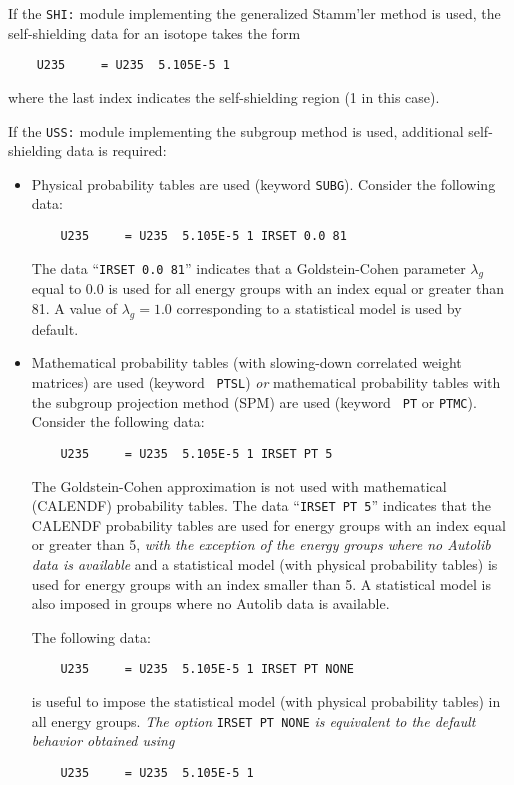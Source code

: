 \vskip 0.15cm

If the {\tt SHI:} module implementing the generalized Stamm'ler method is used,
the self-shielding data for an isotope takes the form
\begin{verbatim}
    U235     = U235  5.105E-5 1
\end{verbatim}
\noindent where the last index indicates the self-shielding region (1 in this case). 

\vskip 0.15cm

If the {\tt USS:} module implementing the subgroup method is used,
additional self-shielding data is required:
\begin{itemize}
\item Physical probability tables are used (keyword {\tt SUBG}). Consider the following data:
\begin{verbatim}
    U235     = U235  5.105E-5 1 IRSET 0.0 81
\end{verbatim}
The data ``{\tt IRSET 0.0 81}'' indicates that a Goldstein-Cohen parameter
$\lambda_g$ equal
to 0.0 is used for all energy groups with an index equal or greater than 81. A value
of $\lambda_g=1.0$ corresponding to a statistical model is used by default.

\item Mathematical probability tables (with slowing-down correlated weight matrices) are used (keyword {\tt
PTSL}) {\sl or} mathematical probability tables with the subgroup projection method (SPM)\cite{SPM09} are used (keyword {\tt
PT} or {\tt PTMC}). Consider the following data:
\begin{verbatim}
    U235     = U235  5.105E-5 1 IRSET PT 5
\end{verbatim}
The Goldstein-Cohen approximation is not
used with mathematical (CALENDF) probability tables. The data ``{\tt IRSET PT 5}'' indicates that
the CALENDF probability tables are used for energy groups with an index equal
or greater than 5, {\sl with the exception of the energy groups where no Autolib data
is available} and a statistical model (with physical probability tables) is used for energy groups with an index smaller
than 5. A statistical model is also imposed in groups where no Autolib data is available.

\vskip 0.15cm

The following data:
\begin{verbatim}
    U235     = U235  5.105E-5 1 IRSET PT NONE
\end{verbatim}
\noindent is useful to impose the statistical model (with physical probability tables) in all energy groups. {\sl The option}
{\tt IRSET PT NONE} {\sl is equivalent to the default behavior obtained using}
\begin{verbatim}
    U235     = U235  5.105E-5 1
\end{verbatim}
\end{itemize}

